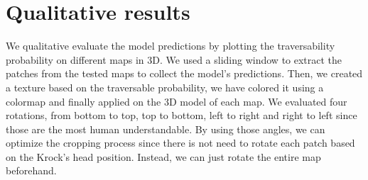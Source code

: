 \documentclass[../document.tex]{subfiles}
\begin{document}
\section{Qualitative results}
We qualitative evaluate the model predictions by plotting the traversability probability on different maps in 3D.  We used a sliding window to extract the patches from the tested maps to collect the model's predictions. Then, we created a texture based on the traversable probability, we have colored it using a colormap and finally applied on the 3D model of each map. We evaluated four rotations, from bottom to top, top to bottom, left to right and right to left since those are the most human understandable. By using those angles, we can optimize the cropping process since there is not need to rotate each patch based on the Krock's head position. Instead, we can just rotate the entire map beforehand. 
\end{document}
